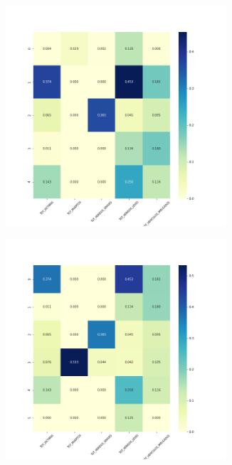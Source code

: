 \begin{figure}[H]
\begin{subfigure}{.5\textwidth}
\end{subfigure}
\begin{subfigure}{.5\textwidth}
  \centering
  \includegraphics[width=0.9\textwidth]{imagenes/case1/agglomerative/heatmaps/hm_agglomerative_case1_entrada_k5.png}
\end{subfigure}
\begin{subfigure}{.5\textwidth}
  \centering
  \includegraphics[width=0.9\textwidth]{imagenes/case1/agglomerative/heatmaps/hm_agglomerative_case1_entrada_k6.png}

\end{subfigure}
\end{figure}
